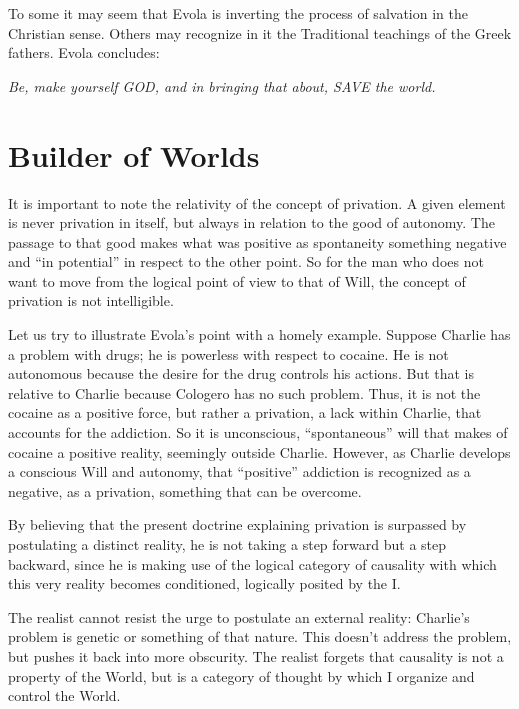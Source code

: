 To some it may seem that Evola is inverting the process of salvation in the Christian sense. Others may recognize in it the Traditional teachings of the Greek fathers. Evola concludes:

\begin{center}\textit{Be, make yourself GOD, and in bringing that about, SAVE the world.}\end{center}

\section{Builder of Worlds}

\begin{quotex}
It is important to note the relativity of the concept of privation. A given element is never privation in itself, but always in relation to the good of autonomy. The passage to that good makes what was positive as spontaneity something negative and ``in potential'' in respect to the other point. So for the man who does not want to move from the logical point of view to that of Will, the concept of privation is not intelligible.
\end{quotex}


Let us try to illustrate Evola's point with a homely example. Suppose Charlie has a problem with drugs; he is powerless with respect to cocaine. He is not autonomous because the desire for the drug controls his actions. But that is relative to Charlie because Cologero has no such problem. Thus, it is not the cocaine as a positive force, but rather a privation, a lack within Charlie, that accounts for the addiction. So it is unconscious, ``spontaneous'' will that makes of cocaine a positive reality, seemingly outside Charlie. However, as Charlie develops a conscious Will and autonomy, that ``positive'' addiction is recognized as a negative, as a privation, something that can be overcome.

\begin{quotex}
By believing that the present doctrine explaining privation is surpassed by postulating a distinct reality, he is not taking a step forward but a step backward, since he is making use of the logical category of causality with which this very reality becomes conditioned, logically posited by the I.
\end{quotex}


The realist cannot resist the urge to postulate an external reality: Charlie's problem is genetic or something of that nature. This doesn't address the problem, but pushes it back into more obscurity. The realist forgets that causality is not a property of the World, but is a category of thought by which I organize and control the World.

